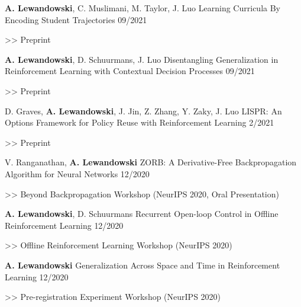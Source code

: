 \begin{cventries}
    \cventry
    {\textbf{A. Lewandowski}, C. Muslimani, M. Taylor, J. Luo}
    {Learning Curricula By Encoding Student Trajectories}
    {09/2021}
    {
      \begin{cvitems}
    	\item[>>] Preprint
      \end{cvitems}
    }

    \cventry
    {\textbf{A. Lewandowski}, D. Schuurmans, J. Luo}
    {Disentangling Generalization in Reinforcement Learning with Contextual
      Decision Processes}
    {09/2021}
    {
      \begin{cvitems}
    	\item[>>] Preprint
      \end{cvitems}
    }

    \cventry
    {D. Graves, \textbf{A. Lewandowski}, J. Jin, Z. Zhang, Y. Zaky, J. Luo}
    {LISPR: An Options Framework for Policy Reuse with Reinforcement Learning}
    {2/2021}
    {
      \begin{cvitems}
    	\item[>>] Preprint
      \end{cvitems}
    }

    \cventry
    {V. Ranganathan, \textbf{A. Lewandowski}}
    {ZORB: A Derivative-Free Backpropagation Algorithm for Neural Networks}
    {12/2020}
    {
      \begin{cvitems}
    	\item[>>] Beyond Backpropagation Workshop (NeurIPS 2020, Oral
      Presentation)
      \end{cvitems}
    }

    \cventry
    { \textbf{A. Lewandowski}, D. Schuurmans}
    {Recurrent Open-loop Control in Offline Reinforcement Learning}
    {12/2020}
    {
      \begin{cvitems}
    	\item[>>] Offline Reinforcement Learning Workshop (NeurIPS 2020)
      \end{cvitems}
    }

    \cventry
    { \textbf{A. Lewandowski}}
    {Generalization Across Space and Time in Reinforcement Learning}
    {12/2020}
    {
      \begin{cvitems}
    	\item[>>] Pre-registration Experiment Workshop (NeurIPS 2020)
      \end{cvitems}
    }


\end{cventries}
